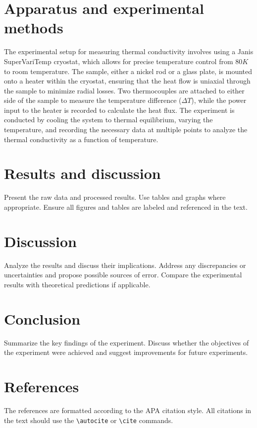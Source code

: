 \documentclass[a4paper,12pt]{article}
\begin{document}
\section{Apparatus and experimental methods}
\label{sec:procedure}
The experimental setup for measuring thermal conductivity involves using a Janis SuperVariTemp cryostat, which allows for precise temperature control from $80\unit{K}$ to room temperature. The sample, either a nickel rod or a glass plate, is mounted onto a heater within the cryostat, ensuring that the heat flow is uniaxial through the sample to minimize radial losses. Two thermocouples are attached to either side of the sample to measure the temperature difference ($\Delta T$), while the power input to the heater is recorded to calculate the heat flux. The experiment is conducted by cooling the system to thermal equilibrium, varying the temperature, and recording the necessary data at multiple points to analyze the thermal conductivity as a function of temperature.

\section{Results and discussion}
\label{sec:results}
Present the raw data and processed results. Use tables and graphs where appropriate. Ensure all figures and tables are labeled and referenced in the text.

\section{Discussion}
\label{sec:discussion}
Analyze the results and discuss their implications. Address any discrepancies or uncertainties and propose possible sources of error. Compare the experimental results with theoretical predictions if applicable.

\section{Conclusion}
\label{sec:conclusion}
Summarize the key findings of the experiment. Discuss whether the objectives of the experiment were achieved and suggest improvements for future experiments.

\section{References}
\label{sec:references}
The references are formatted according to the APA citation style. All citations in the text should use the \texttt{\textbackslash autocite} or \texttt{\textbackslash cite} commands.
\end{document}
